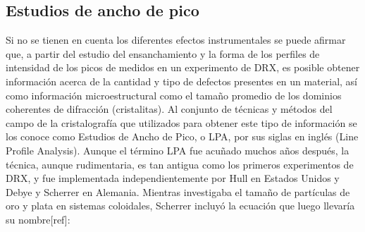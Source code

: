 \subsection{Estudios de ancho de pico}\label{SS:DRX-LPA}
Si no se tienen en cuenta los diferentes efectos instrumentales se puede afirmar que, a partir del estudio del ensanchamiento y la forma de los perfiles de intensidad de los picos de medidos en un experimento de DRX, es posible obtener información acerca de la cantidad y tipo de defectos presentes en un material, así como información microestructural como el tamaño promedio de los dominios coherentes de difracción (cristalitas).
Al conjunto de técnicas y métodos del campo de la cristalografía que utilizados para obtener este tipo de información se los conoce como Estudios de Ancho de Pico, o LPA, por sus siglas en inglés (Line Profile Analysis).
Aunque el término LPA fue acuñado muchos años después, la técnica, aunque rudimentaria, es tan antigua como los primeros experimentos de DRX, y fue implementada independientemente por Hull en Estados Unidos y Debye y Scherrer en Alemania. Mientras investigaba el tamaño de partículas de oro y plata en sistemas coloidales, Scherrer incluyó la ecuación que luego llevaría su nombre[ref]:

